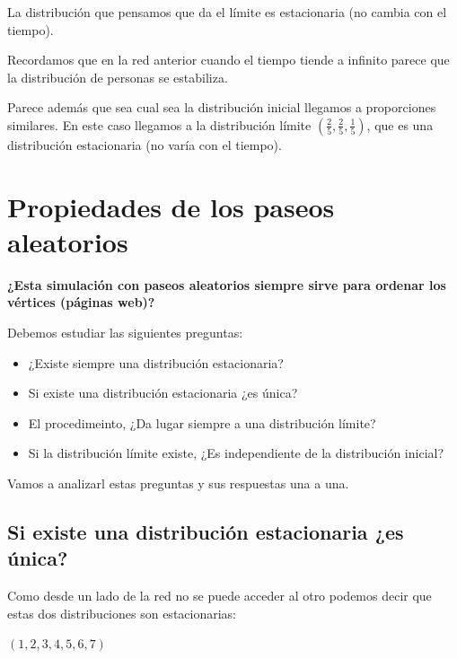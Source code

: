 	La distribución que pensamos que da el límite es estacionaria (no cambia con el tiempo).




Recordamos que en la red anterior cuando el tiempo tiende a infinito parece que la distribución de personas se estabiliza.


Parece además que sea cual sea la distribución inicial llegamos a proporciones similares. En este caso llegamos a la distribución límite $\left(\frac{2}{5},\frac{2}{5},\frac{1}{5}\right)$, que es una distribución estacionaria (no varía con el tiempo).

\section{Propiedades de los paseos aleatorios}

\textbf{¿Esta simulación con paseos aleatorios siempre sirve para ordenar los vértices (páginas web)?}

Debemos estudiar las siguientes preguntas:

\begin{itemize}
	\item ¿Existe siempre una distribución estacionaria?
	\item Si existe una distribución estacionaria ¿es única?
	\item El procedimeinto, ¿Da lugar siempre a una distribución límite?
	\item Si la distribución límite existe, ¿Es independiente de la distribución inicial?

\end{itemize}

Vamos a analizarl estas preguntas y sus respuestas una a una.

\subsection{Si existe una distribución estacionaria ¿es única?}
\label{P2}

\begin{center}
	\centering
\end{center}

Como desde un lado de la red no se puede acceder al otro podemos decir que estas dos distribuciones son estacionarias:

$(1, 2, 3, 4, 5, 6, 7)$

